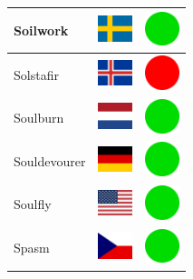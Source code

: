 \documentclass[12pt, a4paper, twoside]{report}
\begin{document}
\begin{center}
\begin{longtable}{|p{5cm}|p{2cm}|p{2cm}|}
Soilwork & \includegraphics[width=1cm]{4x3/se} & \includegraphics[width=1cm]{likes/y} \\ \hline
Solstafir & \includegraphics[width=1cm]{4x3/is} & \includegraphics[width=1cm]{likes/n} \\ \hline
Soulburn & \includegraphics[width=1cm]{4x3/nl} & \includegraphics[width=1cm]{likes/y} \\ \hline
Souldevourer & \includegraphics[width=1cm]{4x3/de} & \includegraphics[width=1cm]{likes/y} \\ \hline
Soulfly & \includegraphics[width=1cm]{4x3/us} & \includegraphics[width=1cm]{likes/y} \\ \hline
Spasm & \includegraphics[width=1cm]{4x3/cz} & \includegraphics[width=1cm]{likes/y} \\ \hline

\end{longtable}
\end{center}
\end{document}
